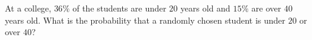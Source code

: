 At a college, $36\%$ of the students are under $20$ years old and $15\%$ are over $40$ years old. What is the probability that a randomly chosen student is under $20$ or over $40$?
